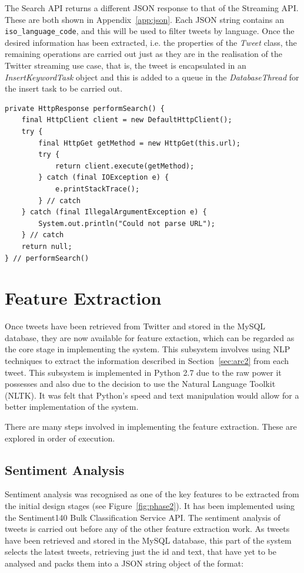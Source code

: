 The Search API returns a different JSON response to that of the Streaming API. These are both shown in Appendix~\ref{app:json}. Each JSON string contains an \texttt{iso\_language\_code}, and this will be used to filter tweets by language. Once the desired information has been extracted, i.e. the properties of the \emph{Tweet} class, the remaining operations are carried out just as they are in the realisation of the Twitter streaming use case, that is, the tweet is encapsulated in an \emph{InsertKeywordTask} object and this is added to a queue in the \emph{DatabaseThread} for the insert task to be carried out.
\newline
\begin{lstlisting}[caption=A HTTP GET request implemented in Java, label=lst:httpget]
private HttpResponse performSearch() {
    final HttpClient client = new DefaultHttpClient();
    try {
        final HttpGet getMethod = new HttpGet(this.url);
        try {
            return client.execute(getMethod);
        } catch (final IOException e) {
            e.printStackTrace();
        } // catch
    } catch (final IllegalArgumentException e) {
        System.out.println("Could not parse URL");
    } // catch
    return null;
} // performSearch()
\end{lstlisting}

\python
\section{Feature Extraction}
\label{sec:fe}
Once tweets have been retrieved from Twitter and stored in the MySQL database, they are now available for feature extaction, which can be regarded as the core stage in implementing the system. This subsystem involves using NLP techniques to extract the information described in Section~\ref{sec:arc2} from each tweet. This subsystem is implemented in Python 2.7 due to the raw power it possesses and also due to the decision to use the Natural Language Toolkit (NLTK). It was felt that Python's speed and text manipulation would allow for a better implementation of the system.

There are many steps involved in implementing the feature extraction. These are explored in order of execution.

\subsection{Sentiment Analysis}
Sentiment analysis was recognised as one of the key features to be extracted from the initial design stages (see Figure~\ref{fig:phase2}). It has been implemented using the Sentiment140 Bulk Classification Service API. 
The sentiment analysis of tweets is carried out before any of the other feature extraction work. As tweets have been retrieved and stored in the MySQL database, this part of the system selects the latest tweets, retrieving just the id and text, that have yet to be analysed and packs them into a JSON string object of the format:

